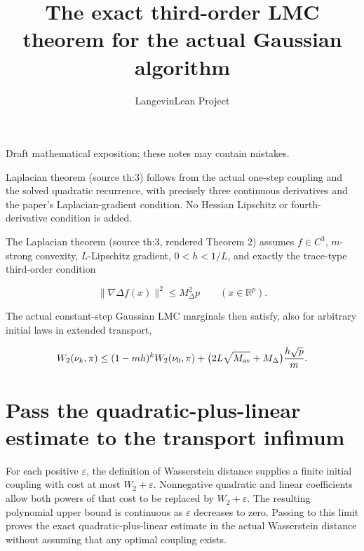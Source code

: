 \documentclass[11pt,a4paper]{article}
\title{\texorpdfstring{The exact third-order LMC theorem for the actual Gaussian algorithm}{The exact third-order LMC theorem for the actual Gaussian algorithm}}
\author{LangevinLean Project}
\date{}
\begin{document}
\maketitle
Draft mathematical exposition; these notes may contain mistakes.


Laplacian theorem (source th:3) follows from the actual one-step coupling and the solved quadratic recurrence, with precisely three continuous derivatives and the paper’s Laplacian-gradient condition. No Hessian Lipschitz or fourth-derivative condition is added.



The Laplacian theorem (source th:3, rendered Theorem 2) assumes \(f\in C^3\), \(m\)-strong convexity, \(L\)-Lipschitz gradient, \(0<h<1/L\), and exactly the trace-type third-order condition


\[\|\nabla\Delta f(x)\|^2\le M_\Delta^2p\qquad(x\in\mathbb R^p).\]


The actual constant-step Gaussian LMC marginals then satisfy, also for arbitrary initial laws in extended transport,


\[W_2(\nu_k,\pi)\le(1-mh)^kW_2(\nu_0,\pi)+\bigl(2L\sqrt{M_{\rm av}}+M_\Delta\bigr)\frac{h\sqrt p}{m}.\]
\section{\texorpdfstring{Pass the quadratic-plus-linear estimate to the transport infimum}{Pass the quadratic-plus-linear estimate to the transport infimum}}


For each positive \(\varepsilon\), the definition of Wasserstein distance supplies a finite initial coupling with cost at most \(W_{2}+\varepsilon\). Nonnegative quadratic and linear coefficients allow both powers of that cost to be replaced by \(W_{2}+\varepsilon\). The resulting polynomial upper bound is continuous as \(\varepsilon\) decreases to zero. Passing to this limit proves the exact quadratic-plus-linear estimate in the actual Wasserstein distance without assuming that any optimal coupling exists.
\end{document}
